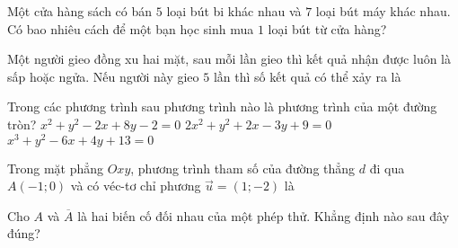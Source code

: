\begin{ex}%
	Một cửa hàng sách có bán $5$ loại bút bi khác nhau và $7$ loại bút máy khác nhau. Có bao nhiêu cách để một bạn học sinh mua $1$ loại bút từ cửa hàng?
\end{ex}
\begin{ex}%
Một người gieo đồng xu hai mặt, sau mỗi lần gieo thì kết quả nhận được luôn là sấp hoặc ngửa. Nếu người này gieo $5$ lần thì số kết quả có thể xảy ra là
\end{ex}
\begin{ex}%
Trong các phương trình sau phương trình nào là phương trình của một đường tròn?
{\True $x^2+y^2-2x+8y-2=0$}
{$2x^2+y^2+2x-3y+9=0$}
{$x^3+y^2-6x+4y+13=0$}
\end{ex}
\begin{ex}%
	Trong mặt phẳng $Oxy$, phương trình tham số của đường thẳng $d$ đi qua $A(-1;0)$ và có véc-tơ chỉ phương $\overrightarrow{u}=(1;-2)$ là
\end{ex}
\begin{ex}%
Cho $A$ và $\overline{A}$ là hai biến cố đối nhau của một phép thử. Khẳng định nào sau đây đúng?
\end{ex}
